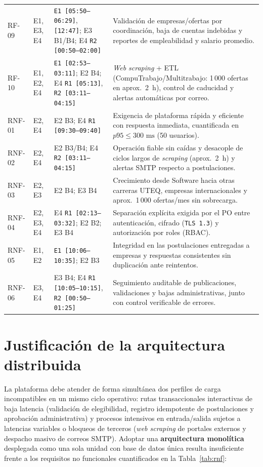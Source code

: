 \documentclass[11pt,a4paper]{article}
\begin{document}
\begin{table}[htbp]
\begin{tabularx}{\textwidth}{l >{\raggedright\arraybackslash}p{1.2cm} >{\raggedright\arraybackslash}p{3.4cm} X}
RF-09 & E1, E3, E4 & \texttt{E1 [05:50--06:29]}, \texttt{[12:47]}; E3 B1/B4; E4 \texttt{R2 [00:50--02:00]} & Validación de empresas/ofertas por coordinación, baja de cuentas indebidas y reportes de empleabilidad y salario promedio. \\
RF-10 & E1, E2, E4 & \texttt{E1 [02:53--03:11]}; E2 B4; E4 \texttt{R1 [05:13]}, \texttt{R2 [03:11--04:15]} & \textit{Web scraping} + ETL (CompuTrabajo/Multitrabajo: 1\,000 ofertas en aprox.\ 2~h), control de caducidad y alertas automáticas por correo. \\
\midrule
RNF-01 & E2, E4 & E2 B3; E4 \texttt{R1 [09:30--09:40]} & Exigencia de plataforma rápida y eficiente con respuesta inmediata, cuantificada en $p95 \le 300\text{ ms}$ (50 usuarios). \\
RNF-02 & E2, E4 & E2 B3/B4; E4 \texttt{R2 [03:11--04:15]} & Operación fiable sin caídas y desacople de ciclos largos de \textit{scraping} (aprox.\ 2~h) y alertas SMTP respecto a postulaciones. \\
RNF-03 & E2, E3 & E2 B4; E3 B4 & Crecimiento desde Software hacia otras carreras UTEQ, empresas internacionales y aprox.\ 1\,000 ofertas/mes sin sobrecarga. \\
RNF-04 & E2, E3, E4 & E4 \texttt{R1 [02:13--03:32]}; E2 B2; E3 B4 & Separación explícita exigida por el PO entre autenticación, cifrado (\texttt{TLS 1.3}) y autorización por roles (RBAC). \\
RNF-05 & E1, E2 & \texttt{E1 [10:06--10:35]}; E2 B3 & Integridad en las postulaciones entregadas a empresas y respuestas consistentes sin duplicación ante reintentos. \\
RNF-06 & E3, E4 & E3 B4; E4 \texttt{R1 [10:05--10:15]}, \texttt{R2 [00:50--01:25]} & Seguimiento auditable de publicaciones, validaciones y bajas administrativas, junto con control verificable de errores. \\
\bottomrule
\end{tabularx}
\end{table}

\section{Justificación de la arquitectura distribuida}

La plataforma debe atender de forma simultánea dos perfiles de carga incompatibles en un mismo ciclo operativo: rutas transaccionales interactivas de baja latencia (validación de elegibilidad, registro idempotente de postulaciones y aprobación administrativa) y procesos intensivos en entrada/salida sujetos a latencias variables o bloqueos de terceros (\textit{web scraping} de portales externos y despacho masivo de correos SMTP). Adoptar una \textbf{arquitectura monolítica} desplegada como una sola unidad con base de datos única resulta insuficiente frente a los requisitos no funcionales cuantificados en la Tabla~\ref{tab:rnf}:
\end{document}
